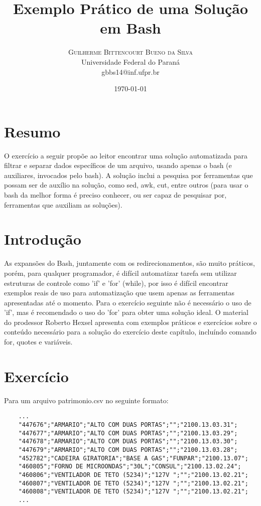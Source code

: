 \documentclass[oneside, 11 pt]{article}
\title{Exemplo Prático de uma Solução em Bash} %
\author{%
	\textsc{Guilherme Bittencourt Bueno da Silva} \\[1ex] %
	\normalsize Universidade Federal do Paraná \\ %
	\normalsize {gbbs14@inf.ufpr.br} %
}
\date{\today} %
\begin{document}
	
	\maketitle
	
	\section{Resumo}
	O exercício a seguir propõe ao leitor encontrar uma solução automatizada para filtrar e separar dados específicos de um arquivo, usando apenas o bash (e auxiliares, invocados pelo bash). A solução inclui a pesquisa por ferramentas que possam ser de auxílio na solução, como sed, awk, cut, entre outros (para usar o bash da melhor forma é preciso conhecer, ou ser capaz de pesquisar por, ferramentas que auxiliam as soluções).

	\section{Introdução}
	As expansões do Bash, juntamente com os redirecionamentos, são muito práticos, porém, para qualquer programador, é difícil automatizar tarefa sem utilizar estruturas de controle como 'if' e 'for' (while), por isso é difícil encontrar exemplos reais de uso para automatização que usem apenas as ferramentas apresentadas até o momento. Para o exercício seguinte não é necessário o uso de 'if', mas é recomendado o uso do 'for' para obter uma solução ideal. O material do prodessor Roberto Hexsel \cite{roberto3} apresenta com exemplos práticos e exercícios sobre o conteúdo necessário para a solução do exercício deste capítulo, incluíndo comando for, quotes e variáveis.
	
	\section{Exercício}
	Para um arquivo patrimonio.csv no seguinte formato:
	\begin{lstlisting}
	...
	"447676";"ARMARIO";"ALTO COM DUAS PORTAS";"";"2100.13.03.31";
	"447677";"ARMARIO";"ALTO COM DUAS PORTAS";"";"2100.13.03.29";
	"447678";"ARMARIO";"ALTO COM DUAS PORTAS";"";"2100.13.03.30";
	"447679";"ARMARIO";"ALTO COM DUAS PORTAS";"";"2100.13.03.28";
	"452782";"CADEIRA GIRATORIA";"BASE A GAS";"FUNPAR";"2100.13.07";
	"460805";"FORNO DE MICROONDAS";"30L";"CONSUL";"2100.13.02.24";
	"460806";"VENTILADOR DE TETO (5234)";"127V ";"";"2100.13.02.21";
	"460807";"VENTILADOR DE TETO (5234)";"127V ";"";"2100.13.02.21";
	"460808";"VENTILADOR DE TETO (5234)";"127V ";"";"2100.13.02.21";
	...
	\end{lstlisting}
	
\end{document}
